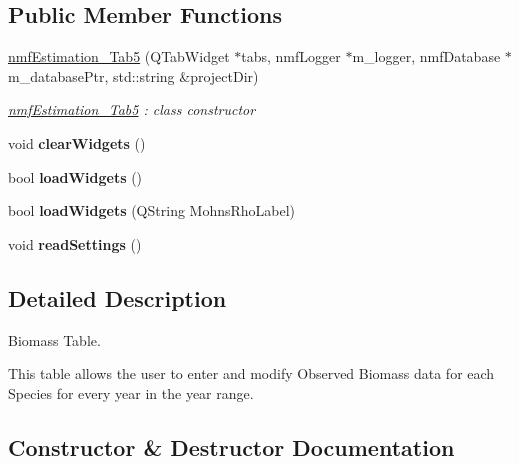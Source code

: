 \subsection*{Public Member Functions}
\begin{DoxyCompactItemize}
\item 
\hyperlink{classnmf_estimation___tab5_a5b7a385222142f130e7f583b5fec6829}{nmf\+Estimation\+\_\+\+Tab5} (Q\+Tab\+Widget $\ast$tabs, nmf\+Logger $\ast$m\+\_\+logger, nmf\+Database $\ast$m\+\_\+database\+Ptr, std\+::string \&project\+Dir)
\begin{DoxyCompactList}\small\item\em \hyperlink{classnmf_estimation___tab5}{nmf\+Estimation\+\_\+\+Tab5} \+: class constructor \end{DoxyCompactList}\item 
void {\bfseries clear\+Widgets} ()\hypertarget{classnmf_estimation___tab5_acdcfaa4b4632eb18c1d322330e9b0adf}{}\label{classnmf_estimation___tab5_acdcfaa4b4632eb18c1d322330e9b0adf}

\item 
bool {\bfseries load\+Widgets} ()\hypertarget{classnmf_estimation___tab5_a520a89098cd0cbf3d5b2c65e2ad6f85c}{}\label{classnmf_estimation___tab5_a520a89098cd0cbf3d5b2c65e2ad6f85c}

\item 
bool {\bfseries load\+Widgets} (Q\+String Mohns\+Rho\+Label)\hypertarget{classnmf_estimation___tab5_a5ff9915bd9995191b8074c7ed8c9f00a}{}\label{classnmf_estimation___tab5_a5ff9915bd9995191b8074c7ed8c9f00a}

\item 
void {\bfseries read\+Settings} ()\hypertarget{classnmf_estimation___tab5_a0843bc4a49702394a0238fcd30184901}{}\label{classnmf_estimation___tab5_a0843bc4a49702394a0238fcd30184901}

\end{DoxyCompactItemize}


\subsection{Detailed Description}
Biomass Table. 

This table allows the user to enter and modify Observed Biomass data for each Species for every year in the year range. 

\subsection{Constructor \& Destructor Documentation}
